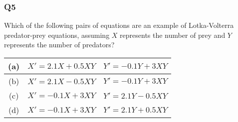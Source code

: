 \documentclass[12pt,a4paper]{article}
\begin{document}
\subsubsection*{Q5}
Which of the following pairs of equations are an example of Lotka-Volterra predator-prey equations, assuming $X$ represents the number of prey and $Y$ represents the number of predators?

\begin{table}[ht!]
	\centering
	\begin{tabular}{|c|c|c|}
	\hline
	(a) & $X' = 2.1X + 0.5XY $& $Y' = -0.1Y + 3XY$\\
	\hline
	(b) & $X' = 2.1X - 0.5XY$& $Y' = -0.1Y + 3XY$\\
	\hline
	(c) & $X' = -0.1X + 3XY$& $Y' = 2.1Y - 0.5XY$\\
	\hline
	(d) & $X' = -0.1X + 3XY$& $Y' = 2.1Y + 0.5XY$\\
	\hline
	\end{tabular}
\end{table}
\end{document}
